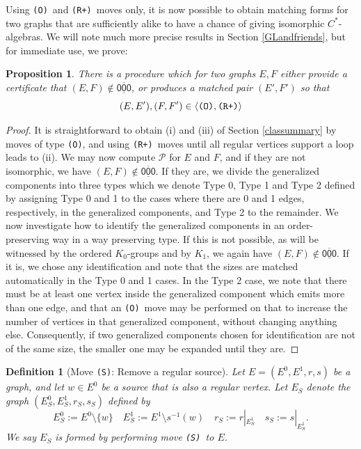 \documentclass[12pt]{amsbook}%
\newtheorem{propo}[theor]{Proposition}
\theoremstyle{defin}
\newtheorem{defin}[theor]{Definition}
\theoremstyle{remark}
\numberwithin{equation}{chapter}
\numberwithin{theor}{section}
\newcommand{\xyzrel}[1]{\mbox{$\overline{\underline{\mathsf{ #1}}}$}}
\newcommand{\OOO}{\mbox{\texttt{\textup{(O)}}}}
\newcommand{\RRRp}{\mbox{\texttt{\textup{(R+)}}}}
\newcommand{\SSS}{\mbox{\texttt{\textup{(S)}}}}
\begin{document}
Using \OOO\ and \RRRp\ moves only, it is now possible to obtain matching forms for two graphs that are sufficiently alike to have a chance of giving isomorphic $C^*$-algebras.  We will note  much more precise results in  Section \ref{GLandfriends}, but for immediate use, we prove:

\begin{propo}\label{getmatched}
There is a procedure which for two graphs $E,F$ either provide a certificate that $(E,F)\not\in \xyzrel{000}$, or produces a matched pair $(E',F')$ so that
\[
(E,E'),(F,F')\in \langle\OOO,\RRRp\rangle
\]
\end{propo}
\begin{proof}
It is straightforward to obtain (i) and (iii) of Section \ref{classummary} by moves of type \OOO, and using \RRRp\ moves until all regular vertices support a loop leads to (ii). We may now compute $\mathcal P$ for $E$ and $F$, and if they are not isomorphic, we have $(E,F)\not\in\xyzrel{000}$. If they are, we divide the generalized components into three types which we denote Type 0, Type 1 and Type 2 defined by assigning Type 0 and 1 to the cases where there are 0 and 1 edges, respectively, in the generalized components, and Type 2 to the remainder. We now investigate how to identify the generalized components in an order-preserving way in a way preserving type. If this is not possible, as will be witnessed by the ordered $K_0$-groups and by $K_1$, we again have $(E,F)\not\in\xyzrel{000}$. If it is, we chose any identification and note that the sizes are matched automatically in the Type 0 and 1 cases. In the Type 2 case, we note that there must be at least one vertex inside the generalized component which emits more than one edge, and that an \OOO\ move may be performed on that to increase the number of vertices in that generalized component, without changing anything else. Consequently, if two generalized components chosen for identification are not of the same size, the smaller one may be expanded until they are.
\end{proof}




\begin{defin}[Move \SSS: Remove a regular source]\label{SSS}\index{S@\SSS}
Let $E = (E^0 , E^1 , r, s)$ be a graph, and let $w\in E^0$ be a source that is also a regular vertex. 
Let $E_S$ denote the graph $(E_S^0 , E_S^1 , r_S , s_S )$ defined by
$$E_S^0 := E^0 \setminus \{w\}\quad
E_S^1 := E^1 \setminus s^{-1} (w)\quad
r_S := r|_{E_S^1}\quad
s_S := s|_{E_S^1}.$$
We  say $E_S$ is formed by performing move \SSS\ to $E$.
\end{defin}
\end{document}
